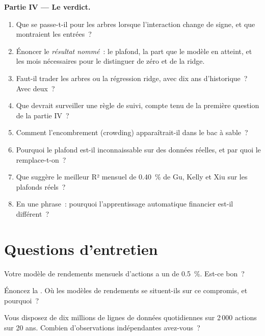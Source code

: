 \begin{problem}
\medskip\noindent\textbf{Partie IV --- Le verdict.}
\begin{enumerate}[resume]
\item Que se passe-t-il pour les arbres lorsque l'interaction change de signe, et que montraient les entrées~?
\item Énoncer le \emph{résultat nommé}~: le plafond, la part que le modèle en atteint, et les mois nécessaires pour le distinguer de zéro
et de la ridge.
\item Faut-il trader les arbres ou la régression ridge, avec dix ans d'historique~? Avec deux~?
\item Que devrait surveiller une règle de suivi, compte tenu de la première question de la partie IV~?
\item Comment l'encombrement (crowding) apparaîtrait-il dans le bac à sable~?
\item Pourquoi le plafond est-il inconnaissable sur des données réelles, et par quoi le remplace-t-on~?
\item Que suggère le meilleur R² mensuel de 0.40~\% de Gu, Kelly et Xiu sur les plafonds réels~?
\item En une phrase~: pourquoi l'apprentissage automatique financier est-il différent~?
\end{enumerate}
\end{problem}

\section{Questions d'entretien}

\begin{interviewq}\label{iq:ml:why-financial-machine-learning-is-different:1}
Votre modèle de rendements mensuels d'actions a un  de 0.5~\%. Est-ce bon~?
\end{interviewq}

\begin{interviewq}\label{iq:ml:why-financial-machine-learning-is-different:2}
Énoncez la . Où les modèles de rendements se situent-ils sur ce compromis, et pourquoi~?
\end{interviewq}

\begin{interviewq}\label{iq:ml:why-financial-machine-learning-is-different:3}
Vous disposez de dix millions de lignes de données quotidiennes sur 2\,000 actions sur 20 ans. Combien d'observations indépendantes avez-vous~?
\end{interviewq}

